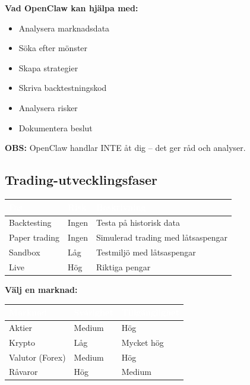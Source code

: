 \documentclass[12pt,a4paper,swedish]{article}
\begin{document}
\bigskip

\textbf{Vad OpenClaw kan hjälpa med:}
\begin{itemize}
    \item Analysera marknadsdata
    \item Söka efter mönster
    \item Skapa strategier
    \item Skriva backtestningskod
    \item Analysera risker
    \item Dokumentera beslut
\end{itemize}

\color{warning}\textbf{OBS:}\color{black} OpenClaw handlar INTE åt dig – det ger råd och analyser.

\subsection{Trading-utvecklingsfaser}
\label{sec:trading-faser}

\begin{center}
\begin{tabular}{|p{3cm}|p{3cm}|p{8cm}|}
\hline
\rowcolor{primary}
\textcolor{white}{\textbf{Fas}} & \textcolor{white}{\textbf{Risk}} & \textcolor{white}{\textbf{Beskrivning}} \\
\hline
Backtesting & \color{success}Ingen\color{black} & Testa på historisk data \\
\hline
Paper trading & \color{success}Ingen\color{black} & Simulerad trading med låtsaspengar \\
\hline
Sandbox & \color{warning}Låg\color{black} & Testmiljö med låtsaspengar \\
\hline
Live & \color{warning}Hög\color{black} & Riktiga pengar \\
\hline
\end{tabular}
\end{center}

\bigskip

\textbf{Välj en marknad:}

\begin{center}
\begin{tabular}{|p{3cm}|p{4cm}|p{5cm}|}
\hline
\rowcolor{secondary}
\textcolor{white}{\textbf{Marknad}} & \textcolor{white}{\textbf{Svårighet}} & \textcolor{white}{\textbf{Tillgänglighet}} \\
\hline
Aktier & Medium & Hög \\
\hline
Krypto & Låg & Mycket hög \\
\hline
Valutor (Forex) & Medium & Hög \\
\hline
Råvaror & Hög & Medium \\
\hline
\end{tabular}
\end{center}
\end{document}
